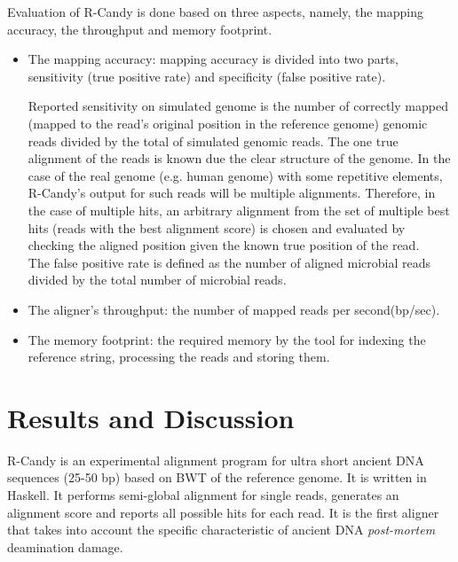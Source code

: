 \documentclass[11pt,a4paper]{report}
\begin{document}
Evaluation of R-Candy is done based on three aspects, namely, 
the mapping accuracy, the throughput and memory footprint.

\begin{itemize}

 \item The mapping accuracy: mapping accuracy is divided into two parts, 
 sensitivity (true positive rate) and specificity (false positive rate).

Reported sensitivity on simulated genome is the number of correctly mapped
(mapped to the read's original position in the reference genome) 
genomic reads divided by the total of simulated genomic reads.
The one true alignment of the reads is known due the clear structure of the genome.
In the case of the real 
genome (e.g. human genome) with some repetitive elements, R-Candy's output
for such reads will be multiple alignments. Therefore, in the case of multiple 
hits, an arbitrary alignment from the set of multiple best hits (reads with 
the best alignment score) is chosen and evaluated by checking the aligned 
position given the known true position of the read.\\

The false positive rate is defined as the number of aligned microbial reads 
divided by the total number of microbial reads.

 \item The aligner's throughput: the number of mapped reads per second(bp/sec).

 \item The memory footprint: the required memory by the tool for indexing 
the reference string, processing the reads and storing them. 

\end{itemize}
 



\section{Results and Discussion} \label{Results and Discussion}

R-Candy is an experimental alignment program for ultra short ancient DNA sequences 
(25-50 bp) based on BWT of the reference genome. It is written in Haskell. 
It performs semi-global alignment for single reads, 
generates an alignment score and reports all possible hits for each read.
It is the first aligner that takes into account the specific characteristic
of ancient DNA \emph{post-mortem} deamination damage.
\end{document}
